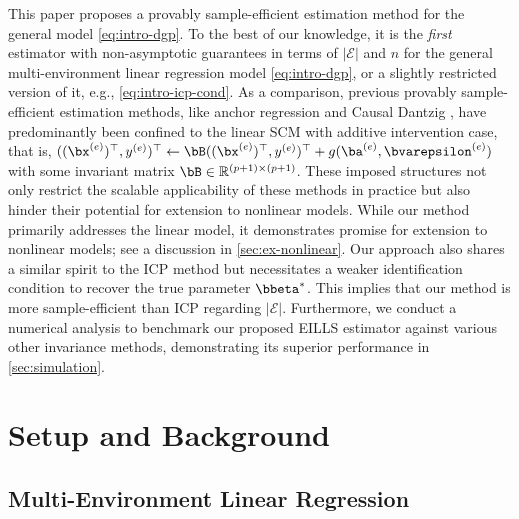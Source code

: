 \documentclass[10pt]{article}
\numberwithin{equation}{section}
\begin{document}
{This paper proposes a provably sample-efficient estimation method for the general model \eqref{eq:intro-dgp}. To the best of our knowledge, it is the {\it first} estimator with non-asymptotic guarantees in terms of $|\mathcal{E}|$ and $n$ for the general multi-environment linear regression model \eqref{eq:intro-dgp}, or a slightly restricted version of it, e.g., \eqref{eq:intro-icp-cond}. As a comparison, previous provably sample-efficient estimation methods, like anchor regression \citep{rothenhausler2021anchor} and Causal Dantzig \citep{rothenhausler2019causal}, have predominantly been confined to the linear SCM with additive intervention case, that is, $((\bx^{(e)})^\top, y^{(e)})^\top \gets \bB ((\bx^{(e)})^\top, y^{(e)})^\top + g(\ba^{(e)}, \bvarepsilon^{(e)})$ with some invariant matrix $\bB\in \mathbb{R}^{(p+1)\times (p+1)}$. These imposed structures not only restrict the scalable applicability of these methods in practice but also hinder their potential for extension to nonlinear models. While our method primarily addresses the linear model, it demonstrates promise for extension to nonlinear models; see a discussion in \cref{sec:ex-nonlinear}. Our approach also shares a similar spirit to the ICP method but necessitates a weaker identification condition to recover the true parameter $\bbeta^*$. This implies that our method is more sample-efficient than ICP regarding $|\mathcal{E}|$. Furthermore, we conduct a numerical analysis to benchmark our proposed EILLS estimator against various other invariance methods, demonstrating its superior performance in \cref{sec:simulation}.


\section{Setup and Background}
\label{sec:setup}

\subsection{Multi-Environment Linear Regression}
\label{subsec:problem-formulation}

}
\end{document}
